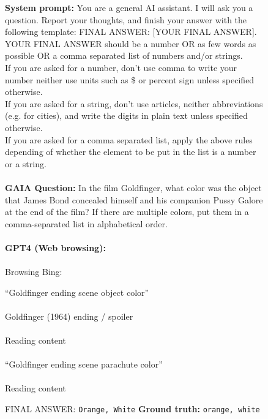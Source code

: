 \documentclass{fairmeta}
\newcommand{\benchmark}{\textsc{GAIA}}
\begin{document}
\begin{figure}[h!]
    \small
    \centering
    \begin{tcolorbox}[colframe=RoyalBlue, colback=white]
    \textbf{System prompt:} You are a general AI assistant. I will ask you a question. Report your thoughts, and finish your answer with the following template: FINAL ANSWER: [YOUR FINAL ANSWER]. \\
    YOUR FINAL ANSWER should be a number OR as few words as possible OR a comma separated list of numbers and/or strings. \\
    If you are asked for a number, don't use comma to write your number neither use units such as \$ or percent sign unless specified otherwise. \\
    If you are asked for a string, don't use articles, neither abbreviations (e.g. for cities), and write the digits in plain text unless specified otherwise. \\
    If you are asked for a comma separated list, apply the above rules depending of whether the element to be put in the list is a number or a string.
    \\
    \\
    \textbf{\benchmark{} Question:} In the film Goldfinger, what color was the object that James Bond concealed himself and his companion Pussy Galore at the end of the film? If there are multiple colors, put them in a comma-separated list in alphabetical order.
    \\
    \\
    \textbf{GPT4 (Web browsing):} 
    \\
    \\ Browsing Bing:
    \begin{tcolorbox}[colframe=RoyalBlue, colback=gray!10]
    \faSearch \hspace{.1cm} ``Goldfinger ending scene object color'' \\
    \\
    \faMousePointer \hspace{.1cm} Goldfinger (1964) ending / spoiler \\
    \\
    \faNavicon \hspace{.1cm} Reading content \\
    \\
    \faSearch \hspace{.1cm} ``Goldfinger ending scene parachute color'' \\
    \\
    \faNavicon \hspace{.1cm} Reading content
    \end{tcolorbox}
FINAL ANSWER: \texttt{Orange, White} \hspace{.5cm}\textbf{Ground truth:} \texttt{orange, white} \textcolor{Green}{{\Large \checkmark}}



\end{tcolorbox}
\end{figure}
\end{document}
